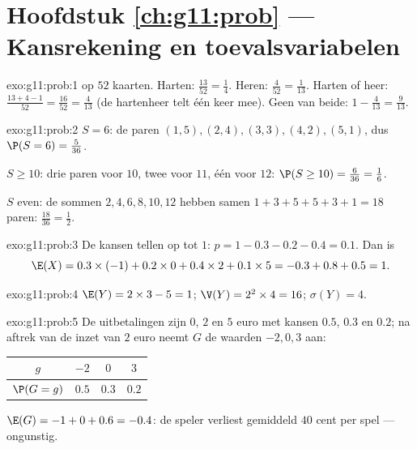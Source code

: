 \section*{Hoofdstuk \ref{ch:g11:prob} --- Kansrekening en toevalsvariabelen}

\begin{solution}{exo:g11:prob:1}
 op $52$ kaarten. Harten: $\frac{13}{52} = \frac14$. Heren:
$\frac{4}{52} = \frac{1}{13}$. Harten of heer:
$\frac{13 + 4 - 1}{52} = \frac{16}{52} = \frac{4}{13}$ (de hartenheer telt
één keer mee). Geen van beide: $1 - \frac{4}{13} = \frac{9}{13}$.
\end{solution}

\begin{solution}{exo:g11:prob:2}
$S = 6$: de paren $(1,5), (2,4), (3,3), (4,2), (5,1)$, dus
$\P(S = 6) = \frac{5}{36}$.

$S \geq 10$: drie paren voor $10$, twee voor $11$, één voor $12$:
$\P(S \geq 10) = \frac{6}{36} = \frac16$.

$S$ even: de sommen $2, 4, 6, 8, 10, 12$ hebben samen
$1 + 3 + 5 + 5 + 3 + 1 = 18$ paren:  $\frac{18}{36} = \frac12$.
\end{solution}

\begin{solution}{exo:g11:prob:3}
De kansen tellen op tot $1$: $p = 1 - 0.3 - 0.2 - 0.4 = 0.1$. Dan is
\[
\E(X) = 0.3 \times (-1) + 0.2 \times 0 + 0.4 \times 2 + 0.1 \times 5
= -0.3 + 0.8 + 0.5 = 1 .
\]
\end{solution}

\begin{solution}{exo:g11:prob:4}
$\E(Y) = 2 \times 3 - 5 = 1$; $\V(Y) = 2^2 \times 4 = 16$;
$\sigma(Y) = 4$.
\end{solution}

\begin{solution}{exo:g11:prob:5}
De uitbetalingen zijn $0$, $2$ en $5$ euro met kansen $0.5$, $0.3$ en $0.2$;
na aftrek van de inzet van $2$ euro neemt $G$ de waarden $-2, 0, 3$ aan:
\begin{center}
\begin{tabular}{c|ccc}
$g$ & $-2$ & $0$ & $3$\\
\hline
$\P(G=g)$ & $0.5$ & $0.3$ & $0.2$
\end{tabular}
\end{center}
$\E(G) = -1 + 0 + 0.6 = -0.4$: de speler verliest gemiddeld $40$ cent per
spel --- ongunstig.
\end{solution}

